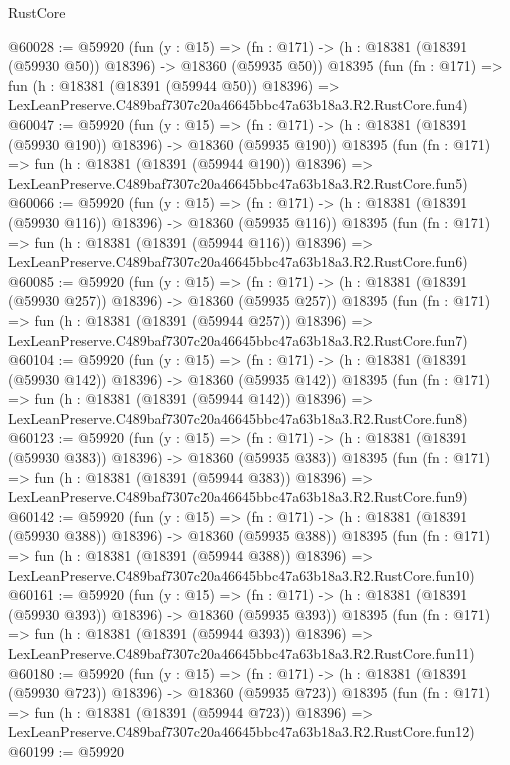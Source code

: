 \begin{lexlean}{RustCore}
\begin{coremodule}
@60028 := @59920
    (fun (y : @15) =>
    (fn : @171) -> (h : @18381 (@18391 (@59930 @50)) @18396) -> @18360 (@59935 @50))
    @18395
    (fun (fn : @171) =>
    fun (h : @18381 (@18391 (@59944 @50)) @18396) =>
    LexLeanPreserve.C489baf7307c20a46645bbc47a63b18a3.R2.RustCore.fun4)
@60047 := @59920
    (fun (y : @15) =>
    (fn : @171) -> (h : @18381 (@18391 (@59930 @190)) @18396) -> @18360 (@59935 @190))
    @18395
    (fun (fn : @171) =>
    fun (h : @18381 (@18391 (@59944 @190)) @18396) =>
    LexLeanPreserve.C489baf7307c20a46645bbc47a63b18a3.R2.RustCore.fun5)
@60066 := @59920
    (fun (y : @15) =>
    (fn : @171) -> (h : @18381 (@18391 (@59930 @116)) @18396) -> @18360 (@59935 @116))
    @18395
    (fun (fn : @171) =>
    fun (h : @18381 (@18391 (@59944 @116)) @18396) =>
    LexLeanPreserve.C489baf7307c20a46645bbc47a63b18a3.R2.RustCore.fun6)
@60085 := @59920
    (fun (y : @15) =>
    (fn : @171) -> (h : @18381 (@18391 (@59930 @257)) @18396) -> @18360 (@59935 @257))
    @18395
    (fun (fn : @171) =>
    fun (h : @18381 (@18391 (@59944 @257)) @18396) =>
    LexLeanPreserve.C489baf7307c20a46645bbc47a63b18a3.R2.RustCore.fun7)
@60104 := @59920
    (fun (y : @15) =>
    (fn : @171) -> (h : @18381 (@18391 (@59930 @142)) @18396) -> @18360 (@59935 @142))
    @18395
    (fun (fn : @171) =>
    fun (h : @18381 (@18391 (@59944 @142)) @18396) =>
    LexLeanPreserve.C489baf7307c20a46645bbc47a63b18a3.R2.RustCore.fun8)
@60123 := @59920
    (fun (y : @15) =>
    (fn : @171) -> (h : @18381 (@18391 (@59930 @383)) @18396) -> @18360 (@59935 @383))
    @18395
    (fun (fn : @171) =>
    fun (h : @18381 (@18391 (@59944 @383)) @18396) =>
    LexLeanPreserve.C489baf7307c20a46645bbc47a63b18a3.R2.RustCore.fun9)
@60142 := @59920
    (fun (y : @15) =>
    (fn : @171) -> (h : @18381 (@18391 (@59930 @388)) @18396) -> @18360 (@59935 @388))
    @18395
    (fun (fn : @171) =>
    fun (h : @18381 (@18391 (@59944 @388)) @18396) =>
    LexLeanPreserve.C489baf7307c20a46645bbc47a63b18a3.R2.RustCore.fun10)
@60161 := @59920
    (fun (y : @15) =>
    (fn : @171) -> (h : @18381 (@18391 (@59930 @393)) @18396) -> @18360 (@59935 @393))
    @18395
    (fun (fn : @171) =>
    fun (h : @18381 (@18391 (@59944 @393)) @18396) =>
    LexLeanPreserve.C489baf7307c20a46645bbc47a63b18a3.R2.RustCore.fun11)
@60180 := @59920
    (fun (y : @15) =>
    (fn : @171) -> (h : @18381 (@18391 (@59930 @723)) @18396) -> @18360 (@59935 @723))
    @18395
    (fun (fn : @171) =>
    fun (h : @18381 (@18391 (@59944 @723)) @18396) =>
    LexLeanPreserve.C489baf7307c20a46645bbc47a63b18a3.R2.RustCore.fun12)
@60199 := @59920

\end{coremodule}
\end{lexlean}
